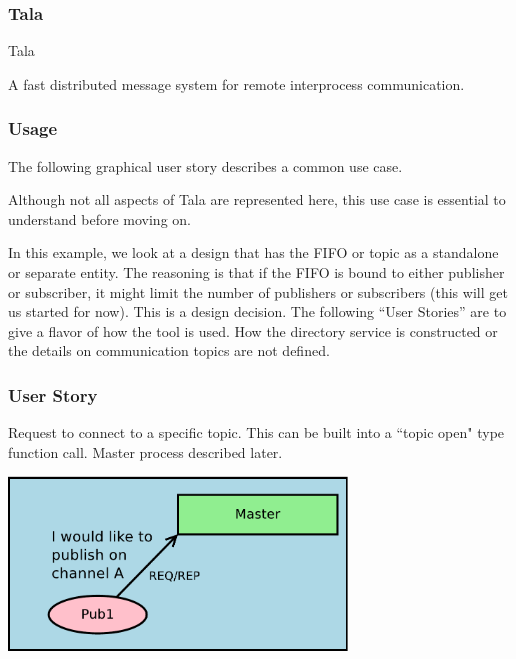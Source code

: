 \documentclass[xcolor=svgnames]{beamer}
\begin{document}

\begin{frame}[fragile]
\frametitle{Tala}

\begin{huge}
Tala
\end{huge}
\vfill

A fast distributed message system for remote interprocess communication.
 
\end{frame}


\begin{frame}[fragile]
\frametitle{Usage}

The following graphical user story describes a common use case.
\vfill

Although not all aspects of Tala are represented here, this use case 
is essential to understand before moving on.
 
 \vfill
 
 In this example, we look at a design that has the FIFO or topic as a 
 standalone or separate entity.  The reasoning is that if the FIFO is 
 bound to either publisher or subscriber, it might limit the number of 
 publishers or subscribers (this will get us started for now).
 \vfill
 This is a design decision.  The following ``User Stories'' are to give
 a flavor of how the tool is used.  How the directory service is constructed
 or the details on communication topics are not defined.
 
\end{frame}

\begin{frame}[fragile]
  \frametitle{User Story}
  
 Request to connect to a specific topic.   This can be built into a ``topic open" type function call.   Master process described later.
\begin{center}
\includegraphics[width=9cm]{./Diagram1.pdf}
\end{center}
\end{frame}
\end{document}
